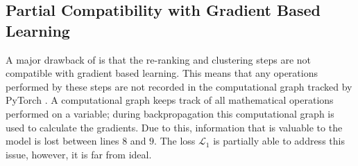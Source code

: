 \subsection{Partial Compatibility with Gradient Based Learning}\label{ssec:c3lr-grad-based}

A major drawback of \ccclr{} is that the re-ranking and clustering steps are not compatible with gradient based learning. This means that any operations performed by these steps are not recorded in the computational graph tracked by PyTorch \parencite{pytorch2019}. A computational graph keeps track of all mathematical operations performed on a variable; during backpropagation this computational graph is used to calculate the gradients.
Due to this, information that is valuable to the model is lost between lines $8$ and $9$. The loss $\mathcal{L}_1$ is partially able to address this issue, however, it is far from ideal.
